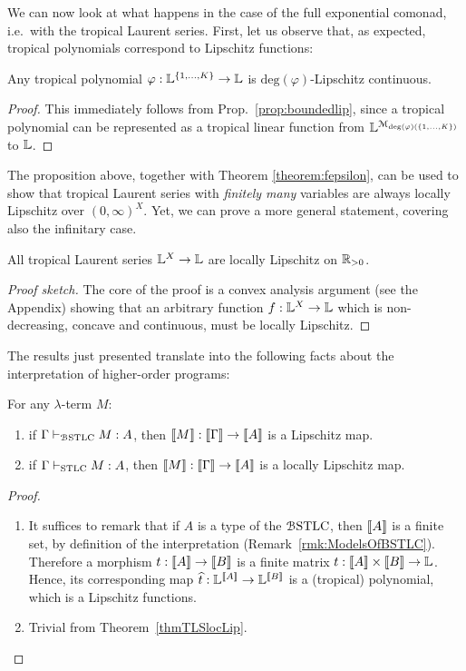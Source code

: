 We can now look at what happens in the case of the full exponential comonad, i.e.~with the tropical Laurent series.
First, let us observe that, as expected, tropical polynomials 
correspond to Lipschitz functions:
\begin{proposition}
Any tropical polynomial $\varphi:\mathbb{L}^{\{1,\dots, K\}}\to\mathbb{L}$ is $\mathrm{deg}(\varphi)$-Lipschitz continuous.
\end{proposition}
\begin{proof}
This immediately follows from Prop.~\ref{prop:boundedlip}, since a tropical polynomial can be represented as a tropical linear function from $\mathbb{L}^{\mathcal{M}_{\mathrm{deg}(\varphi)(\{1,\dots, K\})}}$ to $\mathbb{L}$.
\end{proof}

The proposition above, together with Theorem \ref{theorem:fepsilon}, can be used to show that tropical Laurent series with \emph{finitely many} variables are always locally Lipschitz over $(0,\infty)^{X}$. Yet, we can prove a more general statement, covering also the infinitary case.


\begin{theorem}\label{thmTLSlocLip}
 All tropical Laurent series $\mathbb{L}^X\to\mathbb{L}$ are locally Lipschitz on $\mathbb{R}_{>0}$.
\end{theorem}
\begin{proof}[Proof sketch]
The core of the proof is a convex analysis argument (see the Appendix) showing that an arbitrary function $f:\mathbb{L}^X\to\mathbb{L}$ which is non-decreasing, concave and continuous, must be locally Lipschitz. 
\end{proof}


The results just presented translate into the following facts about the interpretation of higher-order programs:
\begin{corollary}
For any $\lambda$-term $M$:
\begin{enumerate}
\item if $\Gamma \vdash_{\mathcal{B}\mathrm{STLC}} M:A$, then $\llbracket M\rrbracket:\llbracket\Gamma\rrbracket \to \llbracket A\rrbracket$ is a Lipschitz map.
\item if $\Gamma \vdash_{\mathrm{STLC}}M:A$, then $\llbracket M\rrbracket: \llbracket\Gamma\rrbracket \to \llbracket A\rrbracket$ is a locally Lipschitz map.
\end{enumerate}
\end{corollary} 
\begin{proof}
\begin{enumerate}
\item It suffices to remark that if $A$ is a type of the $\mathcal{B}\mathrm{STLC}$, then $\llbracket A\rrbracket$ is a finite set, by definition of the interpretation (Remark~\ref{rmk:ModelsOfBSTLC}).
Therefore a morphism $t:\llbracket A\rrbracket\to \llbracket B\rrbracket$ is a finite matrix $t: \llbracket A\rrbracket \times \llbracket B\rrbracket \to \mathbb{L}$.
Hence, its corresponding map $\widehat t:\mathbb{L}^{\llbracket A\rrbracket} \to \mathbb{L}^{\llbracket B\rrbracket}$ is a (tropical) polynomial, which is a Lipschitz functions.
\item Trivial from Theorem~\ref{thmTLSlocLip}.
\end{enumerate}
\end{proof}


